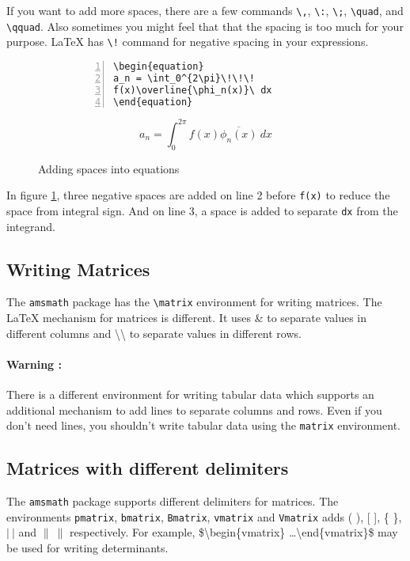 \documentclass{article}
\begin{document}
	If you want to add more spaces, there are a few commands \texttt{\textbackslash,}, \texttt{\textbackslash:}, \texttt{\textbackslash;}, \texttt{\textbackslash quad}, and \texttt{\textbackslash qquad}. Also sometimes you might feel that that the spacing is too much for your purpose. \LaTeX{} has \texttt{\textbackslash!} command for negative spacing in your expressions.

\begin{figure}[h]
\centering
\begin{subfigure}{0.45\textwidth}
\begin{Verbatim}[numbers = left]
\begin{equation}
a_n = \int_0^{2\pi}\!\!\!
f(x)\overline{\phi_n(x)}\ dx
\end{equation}
\end{Verbatim}
\end{subfigure}
\begin{subfigure}{0.45\textwidth}
\begin{equation}
a_n = \int_0^{2\pi}\!\!\! f(x)\overline{\phi_n(x)}\ dx
\end{equation}
\end{subfigure} 
\caption{Adding spaces into equations}
\label{fig:spaceInEquation}
\end{figure}

In figure \ref{fig:spaceInEquation}, three negative spaces are added on line 2 before \texttt{f(x)} to reduce the space from integral sign. And on line 3, a space is added to separate \texttt{dx} from the integrand.

\subsection{Writing Matrices}
	The \texttt{amsmath} package has the \texttt{\textbackslash matrix} environment for writing matrices. The \LaTeX{} mechanism for matrices is different. It uses \& to separate values in different columns and \textbackslash{}\textbackslash{} to separate values in different rows. 

\paragraph{Warning :}
	There is a different environment for writing tabular data which supports an additional mechanism to add lines to separate columns and rows. Even if you don't need lines, you shouldn't write tabular data using the \texttt{matrix} environment.

\subsection{Matrices with different delimiters}
	The \texttt{amsmath} package supports different delimiters for matrices. The environments \texttt{pmatrix}, \texttt{bmatrix}, \texttt{Bmatrix}, \texttt{vmatrix} and \texttt{Vmatrix} adds ( ), [ ], \{ \}, $|\ |$ and $\|\ \|$ respectively. For example, \$\textbackslash begin\{vmatrix\} \dots \textbackslash end\{vmatrix\}\$ may be used for writing determinants.
	
\end{document}
